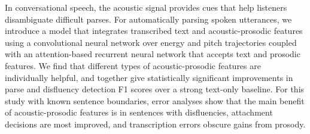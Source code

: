 In conversational speech, the acoustic signal provides cues that help listeners disambiguate difficult parses. For automatically parsing spoken utterances, we introduce a model that integrates transcribed text and acoustic-prosodic features using a convolutional neural network over energy and pitch trajectories coupled with an attention-based recurrent neural network that accepts text and prosodic features. We find that different types of acoustic-prosodic features are individually helpful, and together give statistically significant improvements in parse and disfluency detection F1 scores over a strong text-only baseline. For this study with known sentence boundaries, error analyses show that the main benefit of acoustic-prosodic features is in sentences with disfluencies, attachment decisions are most improved, and transcription errors obscure gains from prosody.
